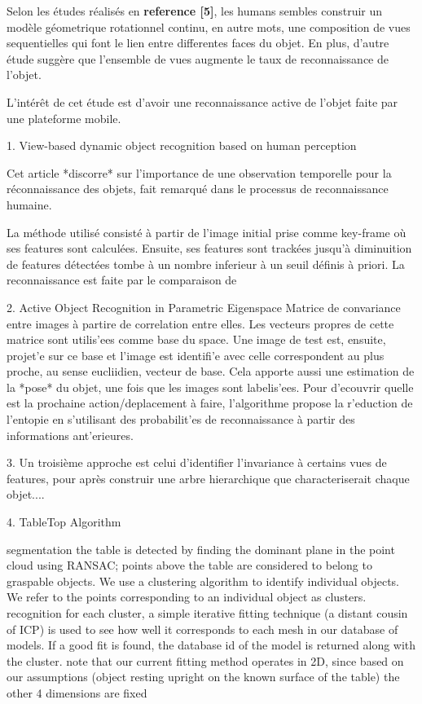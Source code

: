 Selon les études réalisés en \textbf{reference [5]}, les humans sembles construir un modèle géometrique rotationnel continu, en autre mots, une composition de vues sequentielles qui font le lien entre differentes faces du objet. En plus, d'autre étude suggère que l'ensemble de vues augmente le taux de reconnaissance de l'objet.

L'intérêt de cet étude est d'avoir une reconnaissance active de l'objet faite par une plateforme mobile.  


1. View-based dynamic object recognition based on human perception 

Cet article *discorre* sur l'importance de une observation temporelle pour la réconnaissance des objets, fait remarqué dans le processus de reconnaissance humaine.

La méthode utilisé consisté à partir de l'image initial prise comme key-frame où ses features sont calculées. Ensuite, ses features sont trackées jusqu'à diminuition de features détectées tombe à un nombre inferieur à un seuil définis à priori. La reconnaissance est faite par le comparaison de 


2. Active Object Recognition in Parametric Eigenspace
Matrice de convariance entre images à partire de correlation entre elles. Les vecteurs propres de cette matrice sont utilis'ees comme base du space. Une image de test est, ensuite, projet'e sur ce base et l'image est identifi'e avec celle correspondent au plus proche, au sense eucliidien, vecteur de base. Cela apporte aussi une estimation de la *pose* du objet, une fois que les images sont labelis'ees. 
Pour d'ecouvrir quelle est la prochaine action/deplacement à faire, l'algorithme propose la r'eduction de l'entopie en s'utilisant des probabilit'es de reconnaissance à partir des informations ant'erieures.


3. 
Un troisième approche est celui d'identifier l'invariance à certains vues de features, pour après construir une arbre hierarchique que characteriserait chaque objet....

4. TableTop Algorithm

segmentation
the table is detected by finding the dominant plane in the point cloud using RANSAC;
points above the table are considered to belong to graspable objects. We use a clustering algorithm to identify individual objects. We refer to the points corresponding to an individual object as clusters.
recognition
for each cluster, a simple iterative fitting technique (a distant cousin of ICP) is used to see how well it corresponds to each mesh in our database of models. If a good fit is found, the database id of the model is returned along with the cluster.
note that our current fitting method operates in 2D, since based on our assumptions (object resting upright on the known surface of the table) the other 4 dimensions are fixed

